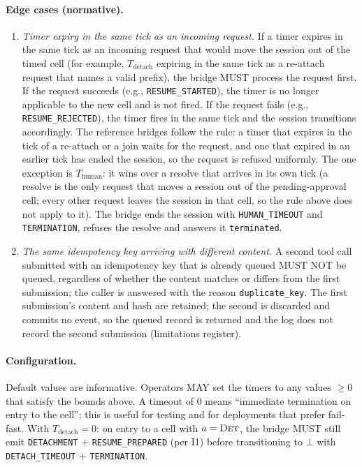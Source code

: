 \paragraph{Edge cases (normative).}
\begin{enumerate}[leftmargin=2em]
\item \emph{Timer expiry in the same tick as an incoming request.}
If a timer expires in the same tick as an incoming request that would
move the session out of the timed cell (for example, $T_{\text{detach}}$
expiring in the same tick as a re-attach request that names a valid
prefix), the bridge MUST process the request first. If the request
succeeds (e.g., \texttt{RESUME\_STARTED}), the timer is no longer
applicable to the new cell and is not fired. If the request fails
(e.g., \texttt{RESUME\_REJECTED}), the timer fires in the same tick
and the session transitions accordingly. The reference bridges follow the
rule: a timer that expires in the tick of a re-attach or a join waits for the
request, and one that expired in an earlier tick has ended the session, so
the request is refused uniformly. The one exception is $T_{\text{human}}$: it
wins over a resolve that arrives in its own tick (a resolve is the only request
that moves a session out of the pending-approval cell; every other request
leaves the session in that cell, so the rule above does not apply to it). The bridge ends the session
with \texttt{HUMAN\_TIMEOUT} and \texttt{TERMINATION}, refuses the resolve and
answers it \texttt{terminated}.
\item \emph{The same idempotency key arriving with different content.}
A second tool call submitted with an idempotency key that is already
queued MUST NOT be queued, regardless of whether the content matches
or differs from the first submission; the caller is answered with the
reason \texttt{duplicate\_key}. The first submission's content
and hash are retained; the second is discarded and commits no event, so
the queued record is returned and the log does not record the second
submission (limitations register).
\end{enumerate}

\paragraph{Configuration.} Default values are informative.
Operators MAY set the timers to any values $\geq 0$ that satisfy the
bounds above. A timeout of $0$ means ``immediate termination on entry to the cell''; this is
useful for testing and for deployments that prefer fail-fast.
With $T_{\text{detach}} = 0$: on entry to a cell with $a=\textsc{Det}$,
the bridge MUST still emit \texttt{DETACHMENT} +
\texttt{RESUME\_PREPARED} (per I1) before transitioning to $\bot$ with
\texttt{DETACH\_TIMEOUT} + \texttt{TERMINATION}.

